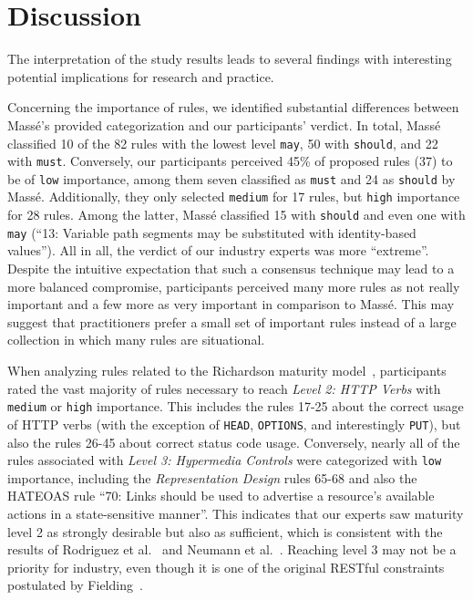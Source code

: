 \documentclass[runningheads]{llncs}
\begin{document}
\section{Discussion}
\label{sec:discussion}
The interpretation of the study results leads to several findings with interesting potential implications for research and practice.

Concerning the importance of rules, we identified substantial differences between Massé's provided categorization and our participants' verdict.
In total, Massé classified 10 of the 82 rules with the lowest level \texttt{may}, 50 with \texttt{should}, and 22 with \texttt{must}.
Conversely, our participants perceived 45\% of proposed rules (37) to be of \texttt{low} importance, among them seven classified as \texttt{must} and 24 as \texttt{should} by Massé.
Additionally, they only selected \texttt{medium} for 17 rules, but \texttt{high} importance for 28 rules.
Among the latter, Massé classified 15 with \texttt{should} and even one with \texttt{may} (\enquote{13: Variable path segments may be substituted with identity-based values}).
All in all, the verdict of our industry experts was more \enquote{extreme}.
Despite the intuitive expectation that such a consensus technique may lead to a more balanced compromise, participants perceived many more rules as not really important and a few more as very important in comparison to Massé.
This may suggest that practitioners prefer a small set of important rules instead of a large collection in which many rules are situational.

When analyzing rules related to the Richardson maturity model~\cite{web:MaturityModel}, participants rated the vast majority of rules necessary to reach \textit{Level 2: HTTP Verbs} with \texttt{medium} or \texttt{high} importance.
This includes the rules 17-25 about the correct usage of HTTP verbs (with the exception of \texttt{HEAD}, \texttt{OPTIONS}, and interestingly \texttt{PUT}), but also the rules 26-45 about correct status code usage.
Conversely, nearly all of the rules associated with \textit{Level 3: Hypermedia Controls} were categorized with \texttt{low} importance, including the \textit{Representation Design} rules 65-68 and also the HATEOAS rule \enquote{70: Links should be used to advertise a resource’s available actions in a state-sensitive manner}.
This indicates that our experts saw maturity level 2 as strongly desirable but also as sufficient, which is consistent with the results of Rodriguez et al.~\cite{article:Rodriguez2016} and Neumann et al.~\cite{Neumann2018}.
Reaching level 3 may not be a priority for industry, even though it is one of the original RESTful constraints postulated by Fielding~\cite{thesis:Rest2000}.
\end{document}
